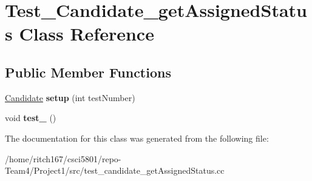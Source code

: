 \hypertarget{classTest__Candidate__getAssignedStatus}{}\section{Test\+\_\+\+Candidate\+\_\+get\+Assigned\+Status Class Reference}
\label{classTest__Candidate__getAssignedStatus}
\subsection*{Public Member Functions}
\begin{DoxyCompactItemize}
\item 
\mbox{\label{classTest__Candidate__getAssignedStatus_a8a2cf6436fc69a4a273263dfc488be01}} 
\hyperlink{classCandidate}{Candidate} {\bfseries setup} (int test\+Number)
\item 
\mbox{\label{classTest__Candidate__getAssignedStatus_aa598c2917a0610a5658a16717390cc85}} 
void {\bfseries test\+\_} ()
\end{DoxyCompactItemize}


The documentation for this class was generated from the following file\+:\begin{DoxyCompactItemize}
\item 
/home/ritch167/csci5801/repo-\/\+Team4/\+Project1/src/test\+\_\+candidate\+\_\+get\+Assigned\+Status.\+cc\end{DoxyCompactItemize}
